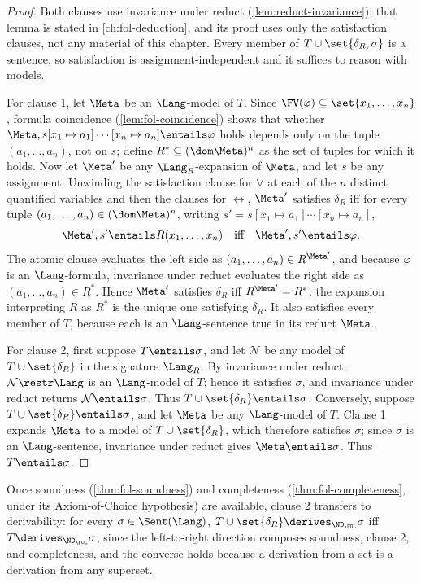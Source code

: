 \begin{proof}
Both clauses use invariance under reduct
(\cref{lem:reduct-invariance}); that lemma is stated in
\cref{ch:fol-deduction}, and its proof uses only the satisfaction clauses,
not any material of this chapter.  Every member of
\(T\cup\set{\delta_R,\sigma}\) is a sentence, so satisfaction is
assignment-independent and it suffices to reason with models.

For clause 1, let \(\Meta\) be an \(\Lang\)-model of \(T\).  Since
\(\FV(\varphi)\subseteq\set{x_1,\ldots,x_n}\), formula coincidence
(\cref{lem:fol-coincidence}) shows that whether
\(\Meta,s[x_1\mapsto a_1]\cdots[x_n\mapsto a_n]\entails\varphi\) holds
depends only on the tuple \((a_1,\ldots,a_n)\), not on \(s\); define
\(R^*\subseteq(\dom\Meta)^n\) as the set of tuples for which it holds.
Now let \(\Meta'\) be any \(\Lang_R\)-expansion of \(\Meta\), and let
\(s\) be any assignment.  Unwinding the satisfaction clause for
\(\forall\) at each of the \(n\) distinct quantified variables and then
the clauses for \(\leftrightarrow\), \(\Meta'\) satisfies \(\delta_R\)
iff for every tuple \((a_1,\ldots,a_n)\in(\dom\Meta)^n\), writing
\(s'=s[x_1\mapsto a_1]\cdots[x_n\mapsto a_n]\),
\[
 \Meta',s'\entails R(x_1,\ldots,x_n)
 \quad\text{iff}\quad
 \Meta',s'\entails\varphi.
\]
The atomic clause evaluates the left side as
\((a_1,\ldots,a_n)\in R^{\Meta'}\), and because \(\varphi\) is an
\(\Lang\)-formula, invariance under reduct evaluates the right side as
\((a_1,\ldots,a_n)\in R^*\).  Hence \(\Meta'\) satisfies \(\delta_R\)
iff \(R^{\Meta'}=R^*\): the expansion interpreting \(R\) as \(R^*\) is
the unique one satisfying \(\delta_R\).  It also satisfies every member
of \(T\), because each is an \(\Lang\)-sentence true in its reduct
\(\Meta\).

For clause 2, first suppose \(T\entails\sigma\), and let \(\mathcal N\)
be any model of \(T\cup\set{\delta_R}\) in the signature \(\Lang_R\).
By invariance under reduct, \(\mathcal N\restr\Lang\) is an
\(\Lang\)-model of \(T\); hence it satisfies \(\sigma\), and invariance
under reduct returns \(\mathcal N\entails\sigma\).  Thus
\(T\cup\set{\delta_R}\entails\sigma\).  Conversely, suppose
\(T\cup\set{\delta_R}\entails\sigma\), and let \(\Meta\) be any
\(\Lang\)-model of \(T\).  Clause 1 expands \(\Meta\) to a model of
\(T\cup\set{\delta_R}\), which therefore satisfies \(\sigma\); since
\(\sigma\) is an \(\Lang\)-sentence, invariance under reduct gives
\(\Meta\entails\sigma\).  Thus \(T\entails\sigma\).
\end{proof}

Once soundness (\cref{thm:fol-soundness}) and completeness
(\cref{thm:fol-completeness}, under its Axiom-of-Choice hypothesis) are
available, clause 2 transfers to derivability: for every
\(\sigma\in\Sent(\Lang)\),
\(T\cup\set{\delta_R}\derives_{\ND_{\FOL}}\sigma\) iff
\(T\derives_{\ND_{\FOL}}\sigma\), since the left-to-right direction
composes soundness, clause 2, and completeness, and the converse holds
because a derivation from a set is a derivation from any superset.

